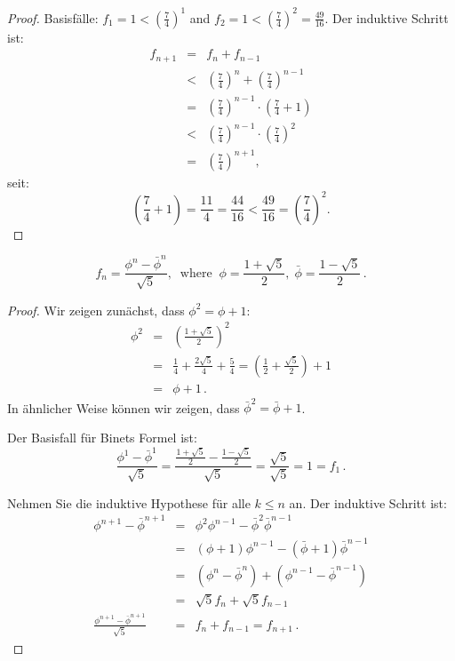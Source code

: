 \begin{proof}
Basisfälle: $f_1=1<\left(\displaystyle\frac{7}{4}\right)^1$ and $f_2=1<\left(\displaystyle\frac{7}{4}\right)^2=\displaystyle\frac{49}{16}$. Der induktive Schritt ist:
\begin{eqnarray*}
f_{n+1}&=&f_n+f_{n-1}\\
&<&\left(\frac{7}{4}\right)^n + \left(\frac{7}{4}\right)^{n-1}\\
&=&\left(\frac{7}{4}\right)^{n-1}\cdot\left(\frac{7}{4}+1\right)\\
&<&\left(\frac{7}{4}\right)^{n-1}\cdot\left(\frac{7}{4}\right)^2\\
&=&\left(\frac{7}{4}\right)^{n+1},
\end{eqnarray*}
seit:
\[
\left(\frac{7}{4}+1\right) = \frac{11}{4} = \frac{44}{16}<\frac{49}{16}=\left(\frac{7}{4}\right)^2.
\]
\end{proof}


\begin{theorem}

\begin{displaymath}
f_n = \frac{\phi^n - \bar{\phi}^n}{\sqrt{5}}, \;\; \mathrm{where} \;\;
\phi = \frac{1+\sqrt{5}}{2},\;\bar{\phi} = \frac{1-\sqrt{5}}{2}\,.
\end{displaymath}
\end{theorem}

\begin{proof}
Wir zeigen zunächst, dass $\phi^2=\phi+1$:
\begin{eqnarray*}
\phi^2 &=& \left(\frac{1+\sqrt{5}}{2}\right)^2\\
&=& \frac{1}{4} + \frac{2\sqrt{5}}{4} + \frac{5}{4}= \left(\frac{1}{2} + \frac{\sqrt{5}}{2}\right) + 1\\
&=&\phi + 1\,.
\end{eqnarray*}
In ähnlicher Weise können wir zeigen, dass $\bar{\phi}^2=\bar{\phi}+1$.

Der Basisfall für Binets Formel ist:
\[
\frac{\phi^1 - \bar{\phi}^1}{\sqrt{5}}=\frac{\frac{1+\sqrt{5}}{2}-\frac{1-\sqrt{5}}{2}}{\sqrt{5}}=\frac{\sqrt{5}}{\sqrt{5}}=1=f_1\,.
\]

Nehmen Sie die induktive Hypothese für alle $k\leq n$ an. Der induktive Schritt ist:
\begin{eqnarray*}
\phi^{n+1} - \bar{\phi}^{n+1} &=& \phi^2\phi^{n-1} - \bar{\phi}^2\bar{\phi}^{n-1}\\
&=&(\phi+1)\phi^{n-1} - (\bar{\phi}+1)\bar{\phi}^{n-1}\\
&=&(\phi^{n} - \bar{\phi}^{n}) + (\phi^{n-1} - \bar{\phi}^{n-1})\\
&=&\sqrt{5}f_{n} + \sqrt{5}f_{n-1}\\
\frac{\phi^{n+1} - \bar{\phi}^{n+1}}{\sqrt{5}} &=& f_{n} + f_{n-1} = f_{n+1}\,.
\end{eqnarray*}
\end{proof}

